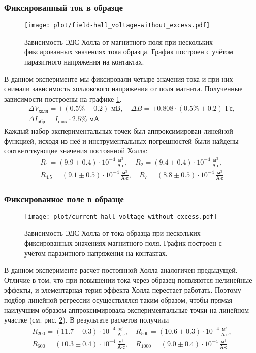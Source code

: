 \documentclass[a4paper,14pt]{extarticle}
\def\Rdim{\,\frac{\text{м}^3}{\text{А} \cdot \text{с}}}
\begin{document}
\subsubsection{Фиксированный ток в образце}

\begin{figure}[H]
	\centering
	\texttt{[image: plot/field-hall\_voltage-without\_excess.pdf]}
	\caption{Зависимость ЭДС Холла от магнитного поля при нескольких фиксированных значениях тока образца. График построен с учётом паразитного напряжения на контактах.}
	\label{fig:5.5}
\end{figure}

В данном эксперименте мы фиксировали четыре значения тока и при них снимали зависимость холловского напряжения от поля магнита. Полученные зависимости построены на графике \ref{fig:5.5}. 
\begin{gather}
	\Delta V_\text{холл} = \pm (0.5\%+0.2) \text{ мВ}, \quad
	\Delta B = \pm0.808\cdot(0.5\%+0.2)\text{ Гс},\\
	\Delta I_\text{обр} = I_{\max}\cdot 2.5\% \text{ мА}
\end{gather}
Каждый набор экспериментальных точек был аппроксимирован линейной функцией, исходя из неё и инструментальных погрешностей были найдены соответствующие значения постоянной Холла:
\begin{gather}
	R_1= (9.9\pm0.4)\cdot10^{-4} \Rdim, 	\quad
R_2= (9.4\pm0.4)\cdot10^{-4} \Rdim,\\
R_{4.5}= (9.1\pm0.5)\cdot10^{-4} \Rdim, 	\quad
R_7= (8.8\pm0.5)\cdot10^{-4} \Rdim
\end{gather}

\subsubsection{Фиксированное поле в образце}
\begin{figure}[H]
	\centering
	\texttt{[image: plot/current-hall\_voltage-without\_excess.pdf]}
	\caption{Зависимость ЭДС Холла от тока образца при нескольких фиксированных значениях магнитного поля. График построен с учётом паразитного напряжения на контактах.}
	\label{fig:5.6}
\end{figure}

В данном эксперименте расчет постоянной Холла аналогичен предыдущей. Отличие в том, что при повышении тока через образец появляются нелинейные эффекты, и элементарная терия эффекта Холла перестает работать. Поэтому подбор линейной регрессии осуществлялся таким образом, чтобы прямая наилучшим образом аппроксимировала экспериментальные точки на линейном участке (см. рис. \ref{fig:5.6}). В результате расчетов получили
\begin{gather}
	R_{200}= (11.7\pm0.3)\cdot10^{-4} \Rdim, 	\quad
R_{500}= (10.6\pm0.3)\cdot10^{-4} \Rdim,\\
R_{600}= (10.3\pm0.4)\cdot10^{-4} \Rdim, 	\quad
R_{1000}= (9.0\pm0.4)\cdot10^{-4} \Rdim
\end{gather}
\end{document}
